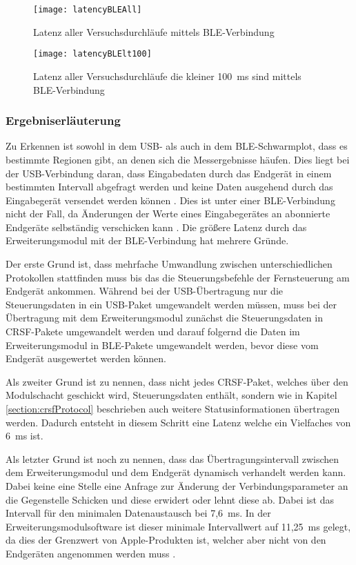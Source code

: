 \begin{figure}[H]
    \centering
    \texttt{[image: latencyBLEAll]}
    \caption{Latenz aller Versuchsdurchläufe mittels \ac{BLE}-Verbindung}
    \label{fig:latencyBLEAll}
\end{figure}

\begin{figure}[H]
    \centering
    \texttt{[image: latencyBLElt100]}
    \caption{Latenz aller Versuchsdurchläufe die kleiner 100~ms sind mittels \ac{BLE}-Verbindung}
    \label{fig:latencyBLElt100}
\end{figure}

\subsubsection{Ergebniserläuterung}
\label{section:resultExplanation}
Zu Erkennen ist sowohl in dem USB- als auch in dem \ac{BLE}-Schwarmplot, dass es bestimmte Regionen gibt, an denen sich die Messergebnisse häufen. Dies liegt bei der USB-Verbindung daran, dass Eingabedaten durch das Endgerät in einem bestimmten Intervall abgefragt werden und keine Daten ausgehend durch das Eingabegerät versendet werden können \cites[S.~48f., S.~277ff.]{usb2Spec}[S.~5]{wimmerLatenzStation}. Dies ist unter einer \ac{BLE}-Verbindung nicht der Fall, da Änderungen der Werte eines Eingabegerätes an abonnierte Endgeräte selbständig verschicken kann \cite[S.~1516]{bluetoothCore}. Die größere Latenz durch das Erweiterungsmodul mit der \ac{BLE}-Verbindung hat mehrere Gründe.

Der erste Grund ist, dass mehrfache Umwandlung zwischen unterschiedlichen Protokollen stattfinden muss bis das die Steuerungsbefehle der Fernsteuerung am Endgerät ankommen. Während bei der USB-Übertragung nur die Steuerungsdaten in ein USB-Paket umgewandelt werden müssen, muss bei der Übertragung mit dem Erweiterungsmodul zunächst die Steuerungsdaten in CRSF-Pakete umgewandelt werden und darauf folgernd die Daten im Erweiterungsmodul in BLE-Pakete umgewandelt werden, bevor diese vom Endgerät ausgewertet werden können.

Als zweiter Grund ist zu nennen, dass nicht jedes CRSF-Paket, welches über den Modulschacht geschickt wird, Steuerungsdaten enthält, sondern wie in Kapitel \ref{section:crsfProtocol} beschrieben auch weitere Statusinformationen übertragen werden. Dadurch entsteht in diesem Schritt eine Latenz welche ein Vielfaches von 6~ms ist.

Als letzter Grund ist noch zu nennen, dass das Übertragungsintervall zwischen dem Erweiterungsmodul und dem Endgerät dynamisch verhandelt werden kann. Dabei keine eine Stelle eine Anfrage zur Änderung der Verbindungsparameter an die Gegenstelle Schicken und diese erwidert oder lehnt diese ab. Dabei ist das Intervall für den minimalen Datenaustausch bei 7,6~ms. In der Erweiterungsmodulsoftware ist dieser minimale Intervallwert auf 11,25~ms gelegt, da dies der Grenzwert von Apple-Produkten ist, welcher aber nicht von den Endgeräten angenommen werden muss \cite[S.~188]{appleDesignGuide}. \cite{bleConnectionParameter}

